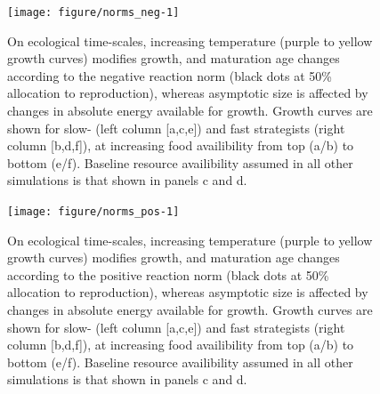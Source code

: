 \documentclass[11pt]{article}\usepackage[]{graphicx}\usepackage[]{color,soul}
\begin{document}
\begin{figure}[!ht]
{\centering 
\texttt{[image: figure/norms\_neg-1]} 
}
\caption[On ecological time-scales, increasing temperature (purple to yellow growth curves) modifies growth, and maturation age changes according to the negative reaction norm (black dots at 50\% allocation to reproduction), whereas asymptotic size is affected by changes in absolute energy available for growth]{On ecological time-scales, increasing temperature (purple to yellow growth curves) modifies growth, and maturation age changes according to the negative reaction norm (black dots at 50\% allocation to reproduction), whereas asymptotic size is affected by changes in absolute energy available for growth. Growth curves are shown for slow- (left column [a,c,e]) and fast strategists (right column [b,d,f]), at increasing food availibility from top (a/b) to bottom (e/f). Baseline resource availibility assumed in all other simulations is that shown in panels c and d.}\label{fig:norms_neg}
\end{figure}

\begin{figure}[!ht]
{\centering 
\texttt{[image: figure/norms\_pos-1]} 
}
\caption[On ecological time-scales, increasing temperature (purple to yellow growth curves) modifies growth, and maturation age changes according to the positive reaction norm (black dots at 50\% allocation to reproduction), whereas asymptotic size is affected by changes in absolute energy available for growth]{On ecological time-scales, increasing temperature (purple to yellow growth curves) modifies growth, and maturation age changes according to the positive reaction norm (black dots at 50\% allocation to reproduction), whereas asymptotic size is affected by changes in absolute energy available for growth. Growth curves are shown for slow- (left column [a,c,e]) and fast strategists (right column [b,d,f]), at increasing food availibility from top (a/b) to bottom (e/f). Baseline resource availibility assumed in all other simulations is that shown in panels c and d.}\label{fig:norms_pos}
\end{figure}
\end{document}
